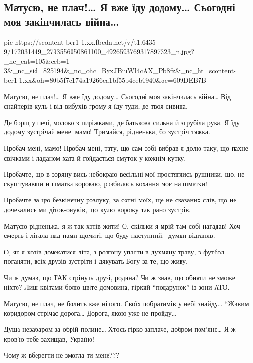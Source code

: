  
 
 
 
 

\subsection{Матусю, не плач!… Я вже їду додому… Сьогодні моя закінчилась війна…}

\ifcmt
  pic https://scontent-ber1-1.xx.fbcdn.net/v/t1.6435-9/172031449_2793556050861100_4926593769317897323_n.jpg?_nc_cat=105&ccb=1-3&_nc_sid=825194&_nc_ohc=ByxJBiuWl4cAX_Pb8fz&_nc_ht=scontent-ber1-1.xx&oh=80b5f7c174a19266ea1bf55b4ceb0940&oe=609DEB7B
\fi

Матусю, не плач!… Я вже їду додому…
Сьогодні моя закінчилась війна…
Від снайперів куль і від вибухів грому
я їду туди, де твоя сивина.

Де борщ у печі, молоко з пиріжками,
де батькова сильна й згрубіла рука.
Я їду додому  зустрічай мене, мамо!
Тримайся, рідненька, бо зустріч тяжка.

Пробач мені, мамо! Пробач мені, тату,
що сам собі вибрав я долю таку,
що пахне свічками і ладаном хата
й гойдається смуток у кожнім кутку.

Пробачте, що в зоряну вись небокраю
весільні мої простяглись рушники,
що, не скуштувавши й шматка короваю,
розбилось кохання моє на шматки!

Пробачте за цю безкінечну розлуку,
за сотні моїх, ще не сказаних слів,
що не дочекались ми діток-онуків,
що кулю ворожу так рано зустрів.

Матусю рідненька, я ж так хотів жити!
О, скільки я мрій там собі нагадав!
Хоч смерть і літала над нами щомиті,
що буду наступний,- думки відганяв.

О, як я хотів дочекатися літа,
з розгону упасти в духмяну траву,
в футбол поганяти, всіх друзів зустріти
і дякувать Богу за те, що живу.

Чи ж думав, що ТАК стрінуть друзі, родина?
Чи ж знав, що обняти не зможе ніхто?
Лиш квітами болю цвіте домовина,
гіркий “подарунок” із зони АТО.

Матусю, не плач, не болить вже нічого.
Своїх побратимів у небі знайду…
“Живим коридором стрічає дорога…
Дорога, якою уже не пройду…

Душа незабаром за обрій полине…
Хтось гірко заплаче, добром пом’яне…
Я ж кров’ю тебе захищав, Україно!

Чому ж
вберегти
не змогла
ти мене???
